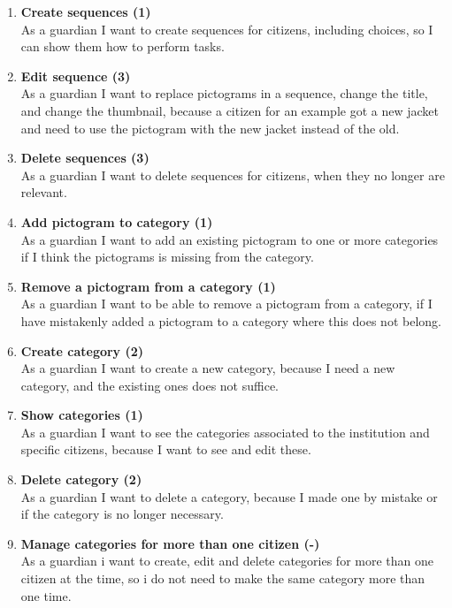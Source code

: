 \begin{enumerate}
	\setcounter{enumi}{0} %
	\item \textbf{Create sequences (1)}\\
	As a guardian I want to create sequences for citizens, including choices, so I can show them how to perform tasks.
	
	\item \textbf{Edit sequence (3)}\\
	As a guardian I want to replace pictograms in a sequence, change the title, and change the thumbnail, because a citizen for an example got a new jacket and need to use the pictogram with the new jacket instead of the old.
	
	\item \textbf{Delete sequences (3)}\\
	As a guardian I want to delete sequences for citizens, when they no longer are relevant.
	
	\item \textbf{Add pictogram to category (1)}\\
	As a guardian I want to add an existing pictogram to one or more categories if I think the pictograms is missing from the category. 
	
	\item \textbf{Remove a pictogram from a category (1)}\\
	As a guardian I want to be able to remove a pictogram from a category, if I have mistakenly added a pictogram to a category where this does not belong.
	
	\item \textbf{Create category (2)}\\
	As a guardian I want to create a new category, because I need a new category, and the existing ones does not suffice. 
	
	\item \textbf{Show categories (1)}\\ 
	As a guardian I want to see the categories associated to the institution and specific citizens, because I want to see and edit these. 
	
	\item \textbf{Delete category (2)}\\ 
	As a guardian I want to delete a category, because I made one by mistake or if the category is no longer necessary.
	
	\item \textbf{Manage categories for more than one citizen (-)}\\
	As a guardian i want to create, edit and delete categories for more than one citizen at the time, so i do not need to make the same category more than one time.
	

\end{enumerate}
